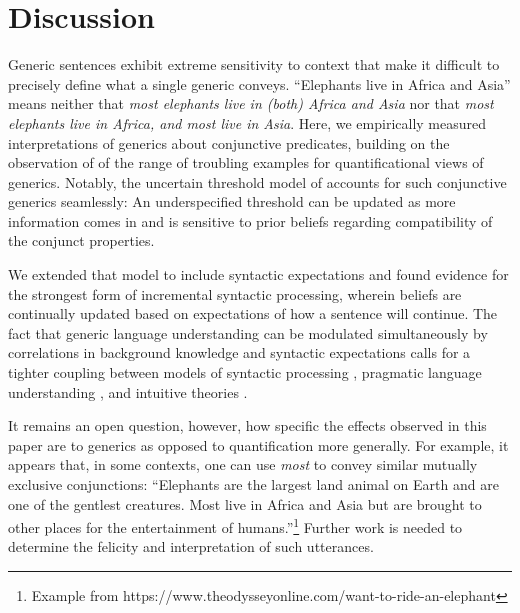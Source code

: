 \documentclass[10pt,letterpaper]{article}
\begin{document}

\section{Discussion}

Generic sentences exhibit extreme sensitivity to context that make it difficult to precisely define what a single generic conveys. 
``Elephants live in Africa and Asia'' means neither that \emph{most elephants live in (both) Africa and Asia} nor that \emph{most elephants live in Africa, and most live in Asia}.
Here, we empirically measured interpretations of generics about conjunctive predicates, building on the observation of  of the range of troubling examples for quantificational views of generics.
Notably, the uncertain threshold model of  accounts for such conjunctive generics seamlessly: An underspecified threshold can be updated as more information comes in and is sensitive to prior beliefs regarding compatibility of the conjunct properties.

We extended that model to include syntactic expectations and found evidence for the strongest form of incremental syntactic processing, wherein beliefs are continually updated based on expectations of how a sentence will continue. 
The fact that generic language understanding can be modulated simultaneously by correlations in background knowledge and syntactic expectations calls for a tighter coupling between models of syntactic processing \cite{Levy2008}, pragmatic language understanding \cite{Goodman2016}, and intuitive theories \cite{tenenbaum2011grow}. 

It remains an open question, however, how specific the effects observed in this paper are to generics as opposed to quantification more generally. 
For example, it appears that, in some contexts, one can use \emph{most} to convey similar mutually exclusive conjunctions: ``Elephants are the largest land animal on Earth and are one of the gentlest creatures. Most live in Africa and Asia but are brought to other places for the entertainment of humans.''\footnote{
Example from https://www.theodysseyonline.com/want-to-ride-an-elephant
}
Further work is needed to determine the felicity and interpretation of such utterances.
\end{document}
